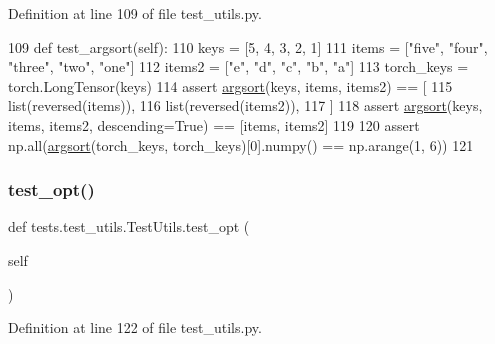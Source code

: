 Definition at line 109 of file test\+\_\+utils.\+py.


\begin{DoxyCode}
109     \textcolor{keyword}{def }test\_argsort(self):
110         keys = [5, 4, 3, 2, 1]
111         items = [\textcolor{stringliteral}{"five"}, \textcolor{stringliteral}{"four"}, \textcolor{stringliteral}{"three"}, \textcolor{stringliteral}{"two"}, \textcolor{stringliteral}{"one"}]
112         items2 = [\textcolor{stringliteral}{"e"}, \textcolor{stringliteral}{"d"}, \textcolor{stringliteral}{"c"}, \textcolor{stringliteral}{"b"}, \textcolor{stringliteral}{"a"}]
113         torch\_keys = torch.LongTensor(keys)
114         \textcolor{keyword}{assert} \hyperlink{namespaceparlai_1_1agents_1_1legacy__agents_1_1seq2seq_1_1utils__v1_a1521e559b740f741ebb47b8755202bb2}{argsort}(keys, items, items2) == [
115             list(reversed(items)),
116             list(reversed(items2)),
117         ]
118         \textcolor{keyword}{assert} \hyperlink{namespaceparlai_1_1agents_1_1legacy__agents_1_1seq2seq_1_1utils__v1_a1521e559b740f741ebb47b8755202bb2}{argsort}(keys, items, items2, descending=\textcolor{keyword}{True}) == [items, items2]
119 
120         \textcolor{keyword}{assert} np.all(\hyperlink{namespaceparlai_1_1agents_1_1legacy__agents_1_1seq2seq_1_1utils__v1_a1521e559b740f741ebb47b8755202bb2}{argsort}(torch\_keys, torch\_keys)[0].numpy() == np.arange(1, 6))
121 
\end{DoxyCode}
\mbox{\label{classtests_1_1test__utils_1_1TestUtils_a595e1217b715af6a4670ee244c9aa61f}} 
\subsubsection{\texorpdfstring{test\+\_\+opt()}{test\_opt()}}
{\footnotesize\ttfamily def tests.\+test\+\_\+utils.\+Test\+Utils.\+test\+\_\+opt (\begin{DoxyParamCaption}\item[{}]{self }\end{DoxyParamCaption})}



Definition at line 122 of file test\+\_\+utils.\+py.


